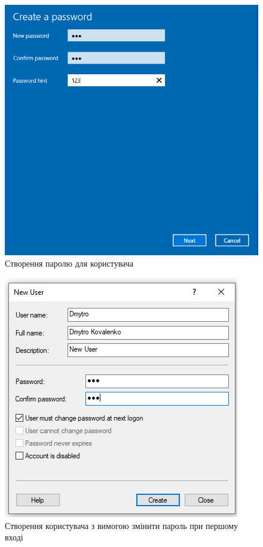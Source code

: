 \documentclass[oneside,14pt]{extarticle}
\begin{document}
\begin{normalsize}
	\begin{figure}[H]
		\centering
		\includegraphics[scale=0.6]{2}
		\caption{Створення паролю для користувача}
	\end{figure}
	
	\begin{figure}[H]
		\centering
		\includegraphics[scale=0.6]{3}
		\caption{Створення користувача з вимогою змінити пароль при першому вході}
	\end{figure}
	

\end{normalsize}
\end{document}
